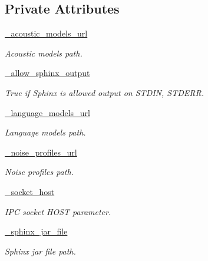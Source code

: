 \subsection*{Private Attributes}
\begin{DoxyCompactItemize}
\item 
\hyperlink{classrapp__speech__detection__sphinx4_1_1global__parameters_1_1GlobalParams_a21df0be4b855b05285c4dc7d35d7454f}{\-\_\-acoustic\-\_\-models\-\_\-url}
\begin{DoxyCompactList}\small\item\em Acoustic models path. \end{DoxyCompactList}\item 
\hyperlink{classrapp__speech__detection__sphinx4_1_1global__parameters_1_1GlobalParams_a401cee442875d271a64c6cff9eb376ed}{\-\_\-allow\-\_\-sphinx\-\_\-output}
\begin{DoxyCompactList}\small\item\em True if Sphinx is allowed output on S\-T\-D\-I\-N, S\-T\-D\-E\-R\-R. \end{DoxyCompactList}\item 
\hyperlink{classrapp__speech__detection__sphinx4_1_1global__parameters_1_1GlobalParams_a669e25ce189ad6cae67f52ebeb3404c7}{\-\_\-language\-\_\-models\-\_\-url}
\begin{DoxyCompactList}\small\item\em Language models path. \end{DoxyCompactList}\item 
\hyperlink{classrapp__speech__detection__sphinx4_1_1global__parameters_1_1GlobalParams_a254c79291b9c78ea0a08b86accdcf3d0}{\-\_\-noise\-\_\-profiles\-\_\-url}
\begin{DoxyCompactList}\small\item\em Noise profiles path. \end{DoxyCompactList}\item 
\hyperlink{classrapp__speech__detection__sphinx4_1_1global__parameters_1_1GlobalParams_a3f81e8f790adf1b6e8de24b8aaa5d7a3}{\-\_\-socket\-\_\-host}
\begin{DoxyCompactList}\small\item\em I\-P\-C socket H\-O\-S\-T parameter. \end{DoxyCompactList}\item 
\hyperlink{classrapp__speech__detection__sphinx4_1_1global__parameters_1_1GlobalParams_aef8bca74a5ed8b58dbe8f842c3e685e0}{\-\_\-sphinx\-\_\-jar\-\_\-file}
\begin{DoxyCompactList}\small\item\em Sphinx jar file path. \end{DoxyCompactList}\item 

\end{DoxyCompactItemize}
